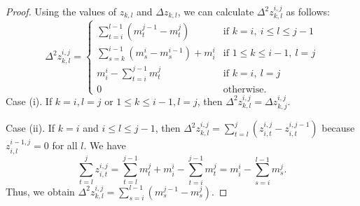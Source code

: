 \documentclass[pdflatex,sn-mathphys-num]{sn-jnl}%
\theoremstyle{thmstyleone}%
\theoremstyle{thmstyletwo}%
\theoremstyle{thmstylethree}%
\begin{document}
\begin{proof}
Using the values of $z_{k,l}$ and $\Delta z_{k,l}$, we can calculate \(\Delta^2 z^{i,j}_{k,l}\) as follows:
\[
\Delta^2 z^{i,j}_{k,l}
=
\begin{cases}
\displaystyle
\sum_{t=i}^{l-1}\left(m^{j-1}_t-m^{j}_t\right)
&\text{if } k=i,\ i\le l \le j-1 \\[10pt]


\displaystyle
\sum_{s=k}^{i-1}\left(m^{i}_s-m^{i-1}_s\right)+m^i_i
&\text{if } 1 \le k \le i-1,\ l=j\\[10pt]

m^i_i-\displaystyle\sum_{t=i}^{j-1} m^{j}_{t}
&\text{if } k=i,\ l=j \\[10pt]

0
& \text{otherwise.}
\end{cases}
\]
Case (i). If $k=i, l=j$ or $1 \le k \le i-1, l=j$, then $\Delta^2 z^{i,j}_{k,l}= \Delta z^{i,j}_{k,j}$.

\noindent Case (ii). If $k=i$ and $i\le l \le j-1$, then $\Delta^2 z^{i,j}_{k,l}= \sum_{t=l}^{j} (z^{i,j}_{i,t}-z^{i,j-1}_{i,t})$ because $z^{i-1,j}_{i,l}=0$ for all $l$. We have \[\sum_{t=l}^{j} z^{i,j}_{i,t} =\sum^{j-1}_{t=l}m^j_t +m^{i}_i-\sum^{j-1}_{t=i}m^j_t=m^i_i -\sum^{l-1}_{s=i}m^j_s.\]
Thus, we obtain $\Delta^2 z^{i,j}_{k,l}=\sum^{l-1}_{s=i}(m^{j-1}_s-m^j_s)$.





\end{proof}
\end{document}

